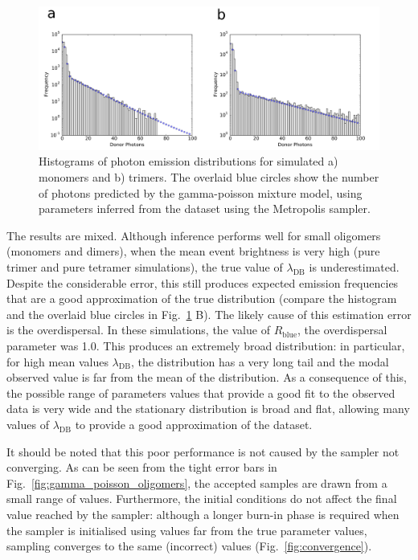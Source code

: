 \begin{figure}
   \begin{center}
      \includegraphics*[clip=true, width=6in]{sizing/oligomer_marginals.pdf}
      \caption{Histograms of photon emission distributions for simulated a) monomers and b) trimers. The overlaid blue circles show the  number of photons predicted by the gamma-poisson mixture model, using parameters inferred from the dataset using the Metropolis sampler.}
      \label{fig:hist_fit_trimer}
   \end{center}
\end{figure}

The results are mixed. Although inference performs well for small oligomers (monomers and dimers), when the mean event brightness is very high (pure trimer and pure tetramer simulations), the true value of $\lambda_{\text{DB}}$ is underestimated. Despite the considerable error, this still produces expected emission frequencies that are a good approximation of the true distribution (compare the histogram and the overlaid blue circles in Fig.~\ref{fig:hist_fit_trimer} B). The likely cause of this estimation error is the overdispersal. In these simulations, the value of $R_{\text{blue}}$, the overdispersal parameter was 1.0. This produces an extremely broad distribution: in particular, for high mean values $\lambda_{\text{DB}}$, the distribution has a very long tail and the modal observed value is far from the mean of the distribution. As a consequence of this, the possible range of parameters values that provide a good fit to the observed data is very wide and the stationary distribution is broad and flat, allowing many values of $\lambda_{\text{DB}}$ to provide a good approximation of the dataset.

It should be noted that this poor performance is not caused by the sampler not converging. As can be seen from the tight error bars in Fig.~\ref{fig:gamma_poisson_oligomers}, the accepted samples are drawn from a small range of values. Furthermore, the initial conditions do not affect the final value reached by the sampler: although a longer burn-in phase is required when the sampler is initialised using values far from the true parameter values, sampling converges to the same (incorrect) values (Fig.~\ref{fig:convergence}).

